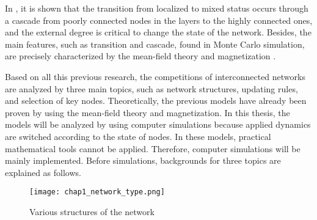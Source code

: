 In \parencite{gomez2015}, it is shown that the transition from localized to mixed status occurs through a cascade from poorly connected nodes in the layers to the highly connected ones, and the external degree is critical to change the state of the network. Besides, the main features, such as transition and cascade, found in Monte Carlo simulation, are precisely characterized by the mean-field theory and magnetization\parencite{alvarez2016, diep2017, amato2017, gomez2015} .

Based on all this previous research, the competitions of interconnected networks are analyzed by three main topics, such as network structures, updating rules, and selection of key nodes. Theoretically, the previous models have already been proven by using the mean-field theory and magnetization. In this thesis, the models will be analyzed by using computer simulations because applied dynamics are switched according to the state of nodes. In these models, practical mathematical tools cannot be applied\parencite{nicolas2017, rainer2002}. Therefore, computer simulations will be mainly implemented. Before simulations, backgrounds for three topics are explained as follows. 

\begin{figure}[!htb]
	\centering
	\texttt{[image: chap1\_network\_type.png]}
	\caption{Various structures of the network}
	\label{chap1_network_type}
\end{figure}

